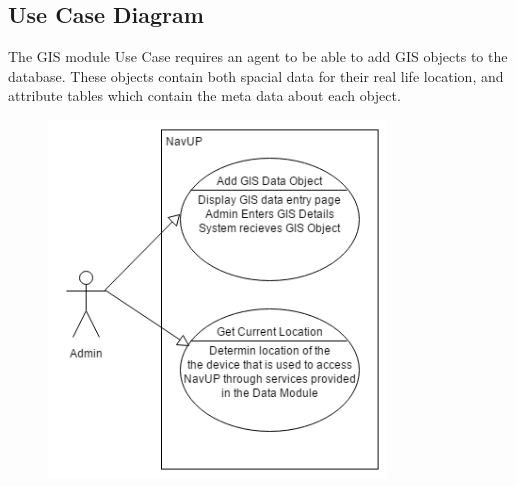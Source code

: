 \subsection{Use Case Diagram}

The GIS module Use Case requires an agent to be able to add GIS objects to the database. These objects contain both spacial data for their real life location, and attribute tables which contain the meta data about each object.

\begin{figure} 
  \includegraphics[width=0.8\textwidth]{GIS_Use_case.png}
\end{figure}